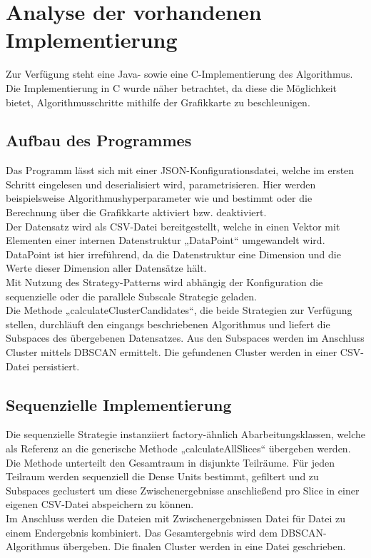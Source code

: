\section{Analyse der vorhandenen Implementierung}
Zur Verfügung steht eine Java- sowie eine C-Implementierung des Algorithmus. Die Implementierung in C wurde näher betrachtet, da diese die Möglichkeit bietet, Algorithmusschritte mithilfe der Grafikkarte zu beschleunigen.

\subsection{Aufbau des Programmes}
Das Programm lässt sich mit einer JSON-Konfigurationsdatei, welche im ersten Schritt eingelesen und deserialisiert wird, parametrisieren. Hier werden beispielsweise Algorithmushyperparameter wie \tau und \epsilon bestimmt oder die Berechnung über die Grafikkarte aktiviert bzw. deaktiviert.\\
Der Datensatz wird als CSV-Datei bereitgestellt, welche in einen Vektor mit Elementen einer internen Datenstruktur „DataPoint“ umgewandelt wird. DataPoint ist hier irreführend, da die Datenstruktur eine Dimension und die Werte dieser Dimension aller Datensätze hält.\\
Mit Nutzung des Strategy-Patterns wird abhängig der Konfiguration die sequenzielle oder die parallele Subscale Strategie geladen.\\
Die Methode „calculateClusterCandidates“, die beide Strategien zur Verfügung stellen, durchläuft den eingangs beschriebenen Algorithmus und liefert die Subspaces des übergebenen Datensatzes. Aus den Subspaces werden im Anschluss Cluster mittels DBSCAN ermittelt. Die gefundenen Cluster werden in einer CSV-Datei persistiert.

\subsection{Sequenzielle Implementierung}
Die sequenzielle Strategie instanziiert factory-ähnlich Abarbeitungsklassen, welche als Referenz an die generische Methode „calculateAllSlices“ übergeben werden.\\
Die Methode unterteilt den Gesamtraum in disjunkte Teilräume. Für jeden Teilraum werden sequenziell die Dense Units bestimmt, gefiltert und zu Subspaces geclustert um diese Zwischenergebnisse anschließend pro Slice in einer eigenen CSV-Datei abspeichern zu können.\\
Im Anschluss werden die Dateien mit Zwischenergebnissen Datei für Datei zu einem Endergebnis kombiniert. Das Gesamtergebnis wird dem DBSCAN-Algorithmus übergeben. Die finalen Cluster werden in eine Datei geschrieben.

